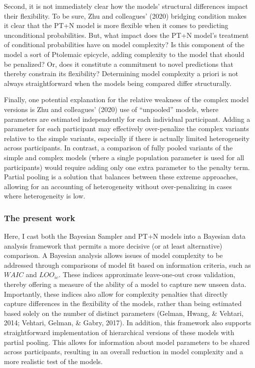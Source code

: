 \documentclass[
  english,
  man,floatsintext]{apa6}
\begin{document}
Second, it is not immediately clear how the models' structural differences impact their flexibility. To be sure, Zhu and colleagues' (2020) bridging condition makes it clear that the PT+N model is more flexible when it comes to predicting unconditional probabilities. But, what impact does the PT+N model's treatment of conditional probabilities have on model complexity? Is this component of the model a sort of Ptolemaic epicycle, adding complexity to the model that should be penalized? Or, does it constitute a commitment to novel predictions that thereby constrain its flexibility? Determining model complexity a priori is not always straightforward when the models being compared differ structurally.

Finally, one potential explanation for the relative weakness of the complex model versions is Zhu and colleagues' (2020) use of ``unpooled'' models, where parameters are estimated independently for each individual participant. Adding a parameter for each participant may effectively over-penalize the complex variants relative to the simple variants, especially if there is actually limited heterogeneity across participants. In contrast, a comparison of fully pooled variants of the simple and complex models (where a single population parameter is used for all participants) would require adding only one extra parameter to the penalty term. Partial pooling is a solution that balances between these extreme approaches, allowing for an accounting of heterogeneity without over-penalizing in cases where heterogeneity is low.

\hypertarget{the-present-work}{%
\subsubsection{The present work}\label{the-present-work}}

Here, I cast both the Bayesian Sampler and PT+N models into a Bayesian data analysis framework that permits a more decisive (or at least alternative) comparison. A Bayesian analysis allows issues of model complexity to be addressed through comparisons of model fit based on information criteria, such as \(WAIC\) and \(LOO_{ic}\). These indices approximate leave-one-out cross validation, thereby offering a measure of the ability of a model to capture new unseen data. Importantly, these indices also allow for complexity penalties that directly capture differences in the flexibility of the models, rather than being estimated based solely on the number of distinct parameters (Gelman, Hwang, \& Vehtari, 2014; Vehtari, Gelman, \& Gabry, 2017). In addition, this framework also supports straightforward implementation of hierarchical versions of these models with partial pooling. This allows for information about model parameters to be shared across participants, resulting in an overall reduction in model complexity and a more realistic test of the models.
\end{document}
